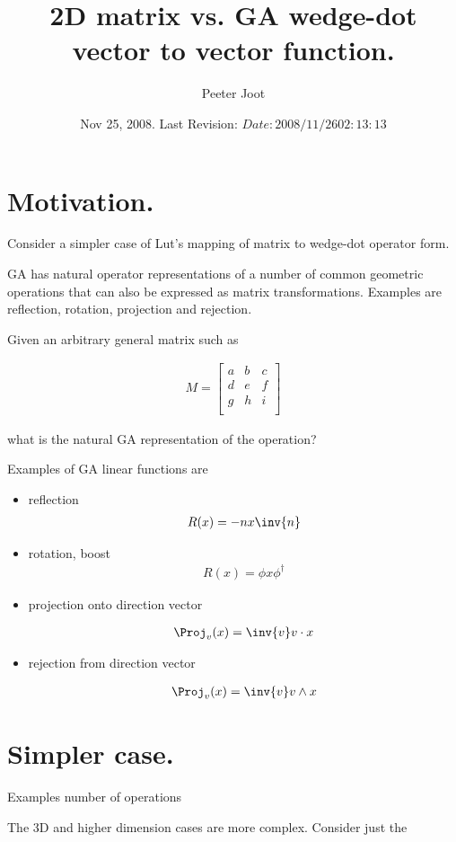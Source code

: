 \documentclass{article}
\title{ 2D matrix vs. GA wedge-dot vector to vector function. }
\author{Peeter Joot}
\date{ Nov 25, 2008.  Last Revision: $Date: 2008/11/26 02:13:13 $ }
\begin{document}
\maketitle{}

\section{ Motivation. }

Consider a simpler case of Lut's mapping of matrix to wedge-dot operator form.

GA has natural operator representations of a number of common geometric
operations that can also be expressed as matrix transformations.  Examples
are reflection, rotation, projection and rejection.

Given an arbitrary general matrix such as 

\begin{align*}
M = 
\begin{bmatrix}
a & b & c \\
d & e & f \\
g & h & i \\
\end{bmatrix}
\end{align*}

what is the natural GA representation of the operation?

Examples of GA linear functions are

\begin{itemize}
\item reflection
\begin{align*}
R(x) = -n x \inv{n}
\end{align*}

\item rotation, boost
\begin{align*}
R(x) = \phi x \phi^\dagger
\end{align*}

\item projection onto direction vector

\begin{align*}
\Proj_v(x) = \inv{v} v \cdot x
\end{align*}

\item rejection from direction vector

\begin{align*}
\Proj_v(x) = \inv{v} v \wedge x
\end{align*}

\end{itemize}

\section{ Simpler case. }

Examples  number of operations 

The 3D and higher dimension cases are more complex.  Consider just the 

%
%
\end{document}
